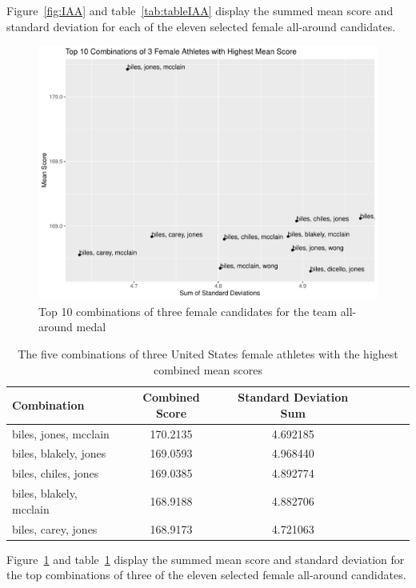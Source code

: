 \documentclass[12pt]{article}
\begin{document}
Figure~\ref{fig:IAA} and table~\ref{tab:tableIAA} display the summed mean score and standard deviation 
for each of the eleven selected female all-around candidates.

\begin{figure}
  \centering
  \includegraphics[scale=0.6]{FemaleAthletesAA3.pdf}
  \caption{Top 10 combinations of three female candidates for the team all-around medal}
  \label{fig:AA3}
\end{figure}

\begin{table}
  \caption{The five combinations of three United States female athletes with the highest combined mean scores}
  \label{tab:tableAA3}
\centering
\begin{tabular}[t]{lccllll}
 \toprule
Combination & Combined Score & Standard Deviation Sum\\
\midrule
biles, jones, mcclain & 170.2135 & 4.692185\\
\midrule
biles, blakely, jones & 169.0593 & 4.968440\\
\midrule
biles, chiles, jones & 169.0385 & 4.892774\\
\midrule
biles, blakely, mcclain & 168.9188 & 4.882706\\
\midrule
biles, carey, jones
& 168.9173 & 4.721063
\\
\bottomrule
\end{tabular}
\end{table} 

Figure~\ref{fig:AA3} and table~\ref{tab:tableAA3} display the summed mean score and standard deviation 
for the top combinations of three of the eleven selected female all-around candidates.
\end{document}

